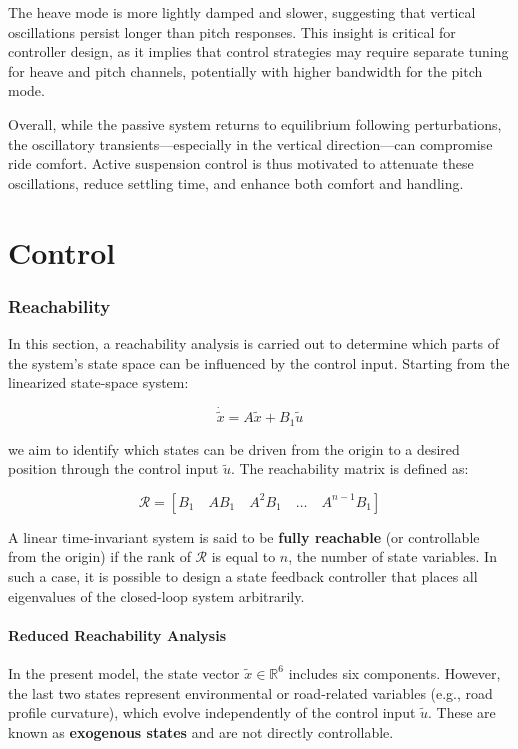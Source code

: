 \documentclass[]{report}
\begin{document}
The heave mode is more lightly damped and slower, suggesting that vertical oscillations persist longer than pitch responses. This insight is critical for controller design, as it implies that control strategies may require separate tuning for heave and pitch channels, potentially with higher bandwidth for the pitch mode.

Overall, while the passive system returns to equilibrium following perturbations, the oscillatory transients—especially in the vertical direction—can compromise ride comfort. Active suspension control is thus motivated to attenuate these oscillations, reduce settling time, and enhance both comfort and handling.




\section{Control}

\subsubsection{Reachability}

In this section, a reachability analysis is carried out to determine which parts of the system's state space can be influenced by the control input. Starting from the linearized state-space system:

\[
\dot{\tilde{x}} = A \tilde{x} + B_1 \tilde{u}
\]

we aim to identify which states can be driven from the origin to a desired position through the control input $\tilde{u}$. The reachability matrix is defined as:

\[
\mathcal{R} = \left[ B_1 \quad AB_1 \quad A^2B_1 \quad \dots \quad A^{n-1}B_1 \right]
\]

A linear time-invariant system is said to be \textbf{fully reachable} (or controllable from the origin) if the rank of $\mathcal{R}$ is equal to $n$, the number of state variables. In such a case, it is possible to design a state feedback controller that places all eigenvalues of the closed-loop system arbitrarily.

\paragraph{Reduced Reachability Analysis}

In the present model, the state vector $\tilde{x} \in \mathbb{R}^6$ includes six components. However, the last two states represent environmental or road-related variables (e.g., road profile curvature), which evolve independently of the control input $\tilde{u}$. These are known as \textbf{exogenous states} and are not directly controllable.
\end{document}

